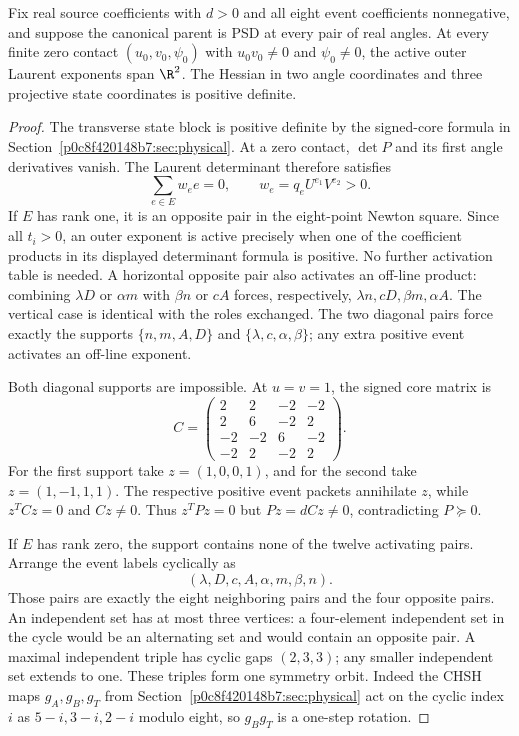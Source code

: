 \begin{theorem}\label{pe25c50379365:thm:curvature}
Fix real source coefficients with $d>0$ and all eight event coefficients nonnegative, and suppose the canonical parent is PSD at every pair of real angles. At every finite zero contact $(u_0,v_0,\psi_0)$ with $u_0v_0\ne0$ and $\psi_0\ne0$, the active outer Laurent exponents span $\R^2$. The Hessian in two angle coordinates and three projective state coordinates is positive definite.
\end{theorem}
\begin{proof}
The transverse state block is positive definite by the signed-core formula in Section~\ref{p0c8f420148b7:sec:physical}. At a zero contact, $\det P$ and its first angle derivatives vanish. The Laurent determinant therefore satisfies
\[
\sum_{e\in E}w_e e=0,\qquad w_e=q_eU^{e_1}V^{e_2}>0.
\]
If $E$ has rank one, it is an opposite pair in the eight-point Newton square. Since all $t_i>0$, an outer exponent is active precisely when one of the coefficient products in its displayed determinant formula is positive. No further activation table is needed.
A horizontal opposite pair also activates an off-line product: combining $\lambda D$ or $\alpha m$ with $\beta n$ or $cA$ forces, respectively, $\lambda n,cD,\beta m,\alpha A$. The vertical case is identical with the roles exchanged. The two diagonal pairs force exactly the supports $\{n,m,A,D\}$ and $\{\lambda,c,\alpha,\beta\}$; any extra positive event activates an off-line exponent.

Both diagonal supports are impossible. At $u=v=1$, the signed core matrix is
\[
C=\begin{pmatrix}2&2&-2&-2\\2&6&-2&2\\-2&-2&6&-2\\-2&2&-2&2\end{pmatrix}.
\]
For the first support take $z=(1,0,0,1)$, and for the second take $z=(1,-1,1,1)$. The respective positive event packets annihilate $z$, while $z^TCz=0$ and $Cz\ne0$. Thus $z^TPz=0$ but $Pz=dCz\ne0$, contradicting $P\succeq0$.

If $E$ has rank zero, the support contains none of the twelve activating pairs. Arrange the event labels cyclically as
\[
(\lambda,D,c,A,\alpha,m,\beta,n).
\]
Those pairs are exactly the eight neighboring pairs and the four opposite pairs. An independent set has at most three vertices: a four-element independent set in the cycle would be an alternating set and would contain an opposite pair. A maximal independent triple has cyclic gaps $(2,3,3)$; any smaller independent set extends to one. These triples form one symmetry orbit. Indeed the CHSH maps $g_A,g_B,g_T$ from Section~\ref{p0c8f420148b7:sec:physical} act on the cyclic index $i$ as $5-i,3-i,2-i$ modulo eight, so $g_Bg_T$ is a one-step rotation.


\end{proof}
